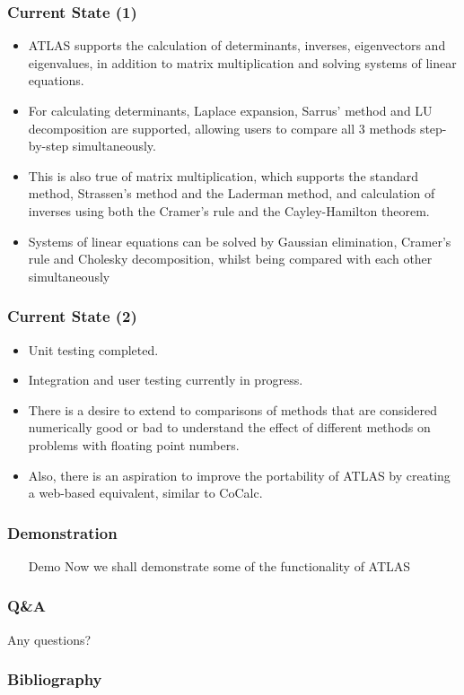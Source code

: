 \begin{frame}%
\frametitle{Current State (1)}\pause
\begin{itemize}[<+->]
\item ATLAS supports the calculation of determinants, inverses, eigenvectors and eigenvalues, in addition to matrix multiplication and solving systems of linear equations.
\item For calculating determinants, Laplace expansion, Sarrus' method and LU decomposition are supported, allowing users to compare all 3 methods step-by-step simultaneously.
\item This is also true of matrix multiplication, which supports the standard method, Strassen's method and the Laderman method, and calculation of inverses using both the Cramer's rule and the Cayley-Hamilton theorem.
\item Systems of linear equations can be solved by Gaussian elimination, Cramer's rule and Cholesky decomposition, whilst being compared with each other simultaneously
\end{itemize}
\end{frame}

\begin{frame}%
\frametitle{Current State (2)}\pause
\begin{itemize}[<+->]
\item Unit testing completed.
\item Integration and user testing currently in progress.
\item There is a desire to extend to comparisons of methods that are considered numerically good or bad to understand the effect of different methods on problems with floating point numbers.
\item Also, there is an aspiration to improve the portability of ATLAS by creating a web-based equivalent, similar to CoCalc.
\end{itemize}
\end{frame}

\begin{frame}
\frametitle{Demonstration}%
\begin{itemize}[<+->]
\item[Demo] Now we shall demonstrate some of the functionality of ATLAS
\end{itemize}
\end{frame}

\begin{frame}
\frametitle{Q\&A}%
\begin{description}[<+->]
\item[?]Any questions?
\end{description}
\end{frame}

\begin{frame}[allowframebreaks]
\frametitle{Bibliography}

\end{frame}



